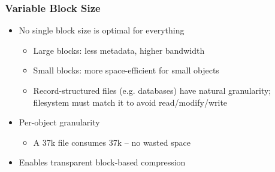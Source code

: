% 
% 
% 
\begin{frame}[fragile]
    \frametitle{Variable Block Size}
    \begin{itemize}
        \item No single block size is optimal for everything
        \begin{itemize}
            \item Large blocks: less metadata, higher bandwidth
            \item Small blocks: more space-efficient for small objects
            \item Record-structured files (e.g. databases) have natural granularity; filesystem must match it to avoid read/modify/write
        \end{itemize} \pause
        \item Per-object granularity
        \begin{itemize}
            \item A 37k file consumes 37k – no wasted space
        \end{itemize}
        \item Enables transparent block-based compression
    \end{itemize}
\end{frame}
% 
% 
% 
